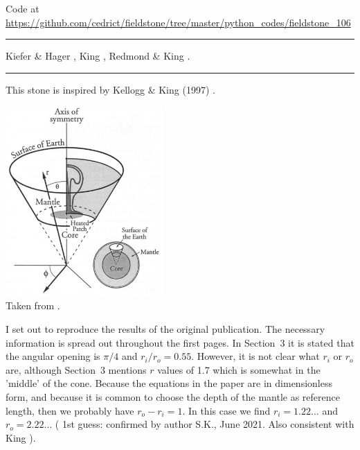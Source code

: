 

\begin{center}
Code at \url{https://github.com/cedrict/fieldstone/tree/master/python_codes/fieldstone_106}
\end{center}

\par\noindent\rule{\textwidth}{0.4pt}

\Literature Kiefer \& Hager \cite{kiha92}, King \cite{king97}, Redmond \& King \cite{reki04}.

\par\noindent\rule{\textwidth}{0.4pt}

This stone is inspired by Kellogg \& King (1997) \cite{keki97}. 

\begin{center}
\includegraphics[width=6cm]{python_codes/fieldstone_106/images/keki97a}\\
{\captionfont Taken from \cite{keki97}.}
\end{center}

I set out to reproduce the results of the original publication. 
The necessary information is spread out throughout the first pages.
In Section~3 it is stated that the angular opening is $\pi/4$ and $r_i/r_o=0.55$.
However, it is not clear what $r_i$ or $r_o$ are, although Section~3
mentions $r$ values of 1.7 which is somewhat in the 'middle' of the cone. 
Because the equations in the paper are in dimensionless form, and 
because it is common to choose the depth of the mantle as reference length, 
then we probably have $r_o-r_i=1$. In this case we find $r_i=1.22\dots$ and 
$r_o=2.22\dots$ ({\color{orange} 1st guess}: confirmed by author S.K., June 2021. 
Also consistent with King \cite{king97}).

